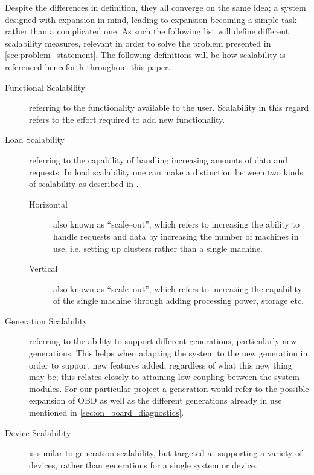 Despite the differences in definition, they all converge on the same idea; a system designed with expansion in mind, leading to expansion becoming a simple task rather than a complicated one.
As such the following list will define different scalability measures, relevant in order to solve the problem presented in \cref{sec:problem_statement}.
The following definitions will be how scalability is referenced henceforth throughout this paper.
\begin{description}
    \item [Functional Scalability]
        referring to the functionality available to the user.
        Scalability in this regard refers to the effort required to add new functionality.
    \item [Load Scalability]
        referring to the capability of handling increasing amounts of data and requests.
        In load scalability one can make a distinction between two kinds of scalability as described in \cite{HoriVertScale}.
        \begin{description}
            \item [Horizontal] also known as ``scale--out'', which refers to increasing the ability to handle requests and data by increasing the number of machines in use, i.e. setting up clusters rather than a single machine.
            \item [Vertical] also known as ``scale--out'', which refers to increasing the capability of the single machine through adding processing power, storage etc.
        \end{description}
    \item [Generation Scalability]
        referring to the ability to support different generations, particularly new generations.
        This helps when adapting the system to the new generation in order to support new features added, regardless of what this new thing may be; this relates closely to attaining low coupling between the system modules.
        For our particular project a generation would refer to the possible expansion of \ac{OBD} as well as the different generations already in use mentioned in \cref{sec:on_board_diagnostics}.
    \item [Device Scalability]
        is similar to generation scalability, but targeted at supporting a variety of devices, rather than generations for a single system or device.
\end{description}

